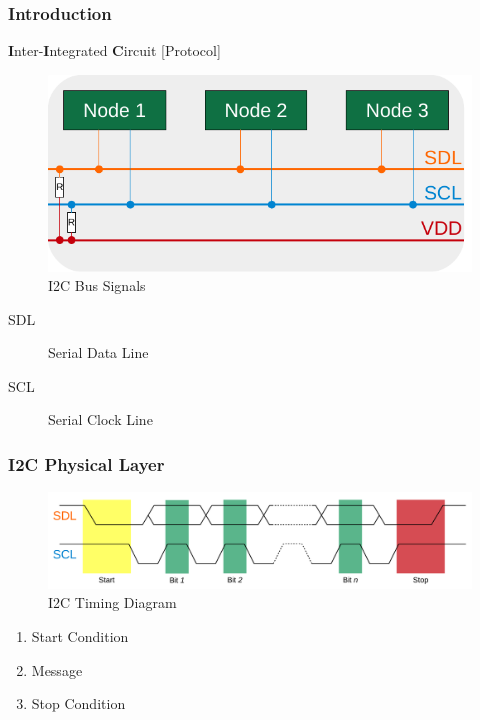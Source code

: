 \documentclass{beamer}
\renewcommand{\emph}[1]{\textbf{\textcolor{greeniot2}{#1}}}
\begin{document}
\begin{frame}
  \frametitle{Introduction}
  
  \emph{I}nter-\emph{I}ntegrated \emph{C}ircuit [Protocol]
  
  \begin{figure}[H]
    \includegraphics[width=.7\textwidth]{images/i2c-bus.pdf}
    \caption{I2C Bus Signals}
  \end{figure}
  
  \begin{description}
    \item[SDL] Serial Data Line
    \item[SCL] Serial Clock Line
  \end{description}
\end{frame}

\begin{frame}
  \frametitle{I2C Physical Layer}
  
  \begin{figure}[H]
    \includegraphics[width=.9\textwidth]{images/i2c-timing.pdf}
    \caption{I2C Timing Diagram}
  \end{figure}
  
  \begin{enumerate}
    \item Start Condition
    \item Message
    \item Stop Condition
  \end{enumerate}
\end{frame}
\end{document}
